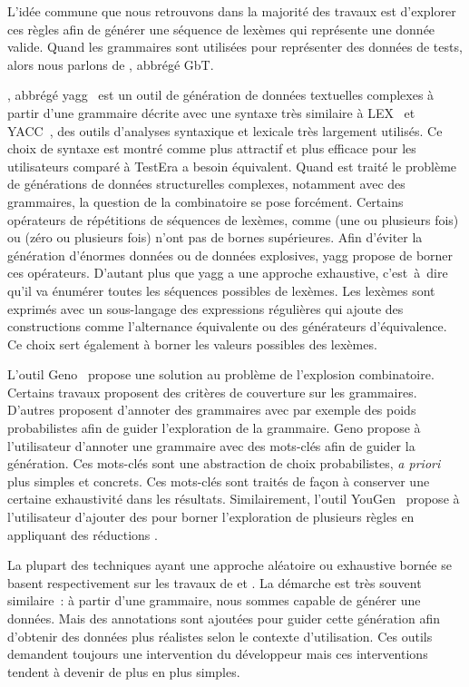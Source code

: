 L'idée commune que nous retrouvons dans la majorité des travaux est d'explorer
ces règles afin de générer une {\strong séquence de lexèmes} qui représente une
donnée valide. Quand les grammaires sont utilisées pour représenter des données
de tests, alors nous parlons de , abbrégé GbT.

, abbrégé yagg~ est
un outil de génération de données textuelles complexes à partir d'une grammaire
décrite avec une syntaxe très similaire à LEX~ et
YACC~, des outils d'analyses syntaxique et lexicale très
largement utilisés. Ce choix de syntaxe est montré comme plus attractif et plus
efficace pour les utilisateurs comparé à TestEra a besoin équivalent. Quand est
traité le problème de générations de données structurelles complexes, notamment
avec des grammaires, la question de la combinatoire se pose forcément. Certains
opérateurs de répétitions de séquences de lexèmes, comme \code{+} (une ou
plusieurs fois) ou \code{*} (zéro ou plusieurs fois) n'ont pas de bornes
supérieures. Afin d'éviter la génération d'énormes données ou de données
explosives, yagg propose de borner ces opérateurs. D'autant plus que yagg a une
approche exhaustive, c'est~à~dire qu'il va énumérer toutes les séquences
possibles de lexèmes.  Les lexèmes sont exprimés avec un sous-langage des
expressions régulières qui ajoute des constructions comme l'alternance
équivalente ou des générateurs d'équivalence.  Ce choix sert également à borner
les valeurs possibles des lexèmes.

L'outil Geno~ propose une solution au problème de l'explosion
combinatoire. Certains travaux proposent des critères de couverture sur les
grammaires. D'autres proposent d'annoter des grammaires avec par exemple des
poids probabilistes afin de guider l'exploration de la grammaire. Geno propose à
l'utilisateur d'annoter une grammaire avec des mots-clés afin de guider la
génération. Ces mots-clés sont une abstraction de choix probabilistes, {\em a
priori} plus simples et concrets. Ces mots-clés sont traités de façon à
conserver une certaine exhaustivité dans les résultats. Similairement, l'outil
YouGen~ propose à l'utilisateur d'ajouter des
 pour borner l'exploration de plusieurs règles en appliquant des
réductions .

La plupart des techniques ayant une approche aléatoire ou exhaustive bornée se
basent respectivement sur les travaux de  et
. La démarche est très souvent similaire~: à partir d'une
grammaire, nous sommes capable de générer une données. Mais des annotations sont
ajoutées pour guider cette génération afin d'obtenir des données plus réalistes
selon le contexte d'utilisation. Ces outils demandent toujours une intervention
du développeur mais ces interventions tendent à devenir de plus en plus simples.

